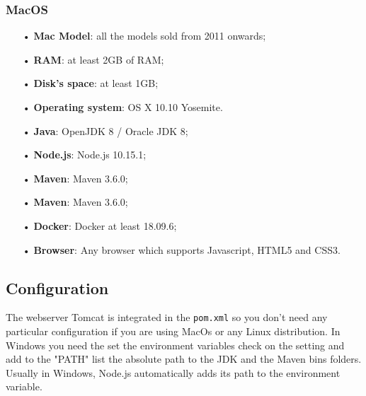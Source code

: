 \subsubsection{MacOS}
\begin{itemize}
\item [•]\textbf{Mac Model}: all the models sold from 2011 onwards;
\item [•]\textbf{RAM}: at least 2GB of RAM;
\item [•]\textbf{Disk’s space}: at least 1GB;
\item [•]\textbf{Operating system}: OS X 10.10 Yosemite.
\item [•]\textbf{Java}: OpenJDK 8 / Oracle JDK 8;
\item [•]\textbf{Node.js}: Node.js 10.15.1;
\item [•]\textbf{Maven}: Maven 3.6.0;
\item [•]\textbf{Maven}: Maven 3.6.0;
\item [•]\textbf{Docker}: Docker at least 18.09.6;  
\item [•]\textbf{Browser}: Any browser which supports Javascript, HTML5 and CSS3.
\end{itemize}

\subsection{Configuration}
The webserver Tomcat is integrated in the \texttt{pom.xml} so you don't need any particular configuration if you are using MacOs or any Linux distribution.
In Windows you need the set the environment variables check on the setting and add to the "PATH" list the absolute path to the JDK and the Maven bins folders.
Usually in Windows, Node.js automatically adds its path to the environment variable.
